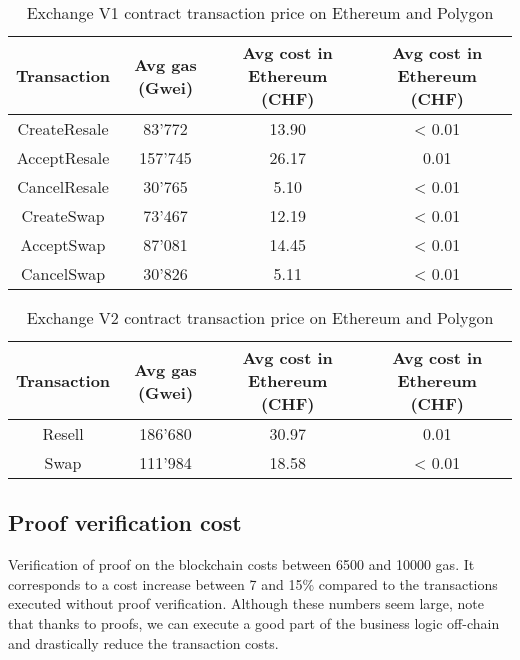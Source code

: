 \documentclass[a4paper,11pt,oneside]{report}
\begin{document}
\begin{table}[h!]
\begin{center}
\begin{NiceTabular}{ |c||c|c|c| }
 \hline
 Transaction & Avg gas (Gwei) & Avg cost in Ethereum (CHF) & Avg cost in Ethereum (CHF) \\
 \hline \hline
 CreateResale & 83'772 & 13.90 & < 0.01 \\
 AcceptResale & 157'745 & 26.17 & 0.01 \\
 CancelResale & 30'765 & 5.10 & < 0.01 \\
 CreateSwap & 73'467 & 12.19 & < 0.01 \\
 AcceptSwap & 87'081 & 14.45 & < 0.01 \\
 CancelSwap & 30'826 & 5.11 & < 0.01 \\
 \hline
\end{NiceTabular}
\caption{Exchange V1 contract transaction price on Ethereum and Polygon}
\label{table:exchangeV1_contract_transaction_cost}
\end{center}
\end{table}

\begin{table}[h!]
\begin{center}
\begin{NiceTabular}{ |c||c|c|c| }
 \hline
 Transaction & Avg gas (Gwei) & Avg cost in Ethereum (CHF) & Avg cost in Ethereum (CHF) \\
 \hline \hline
 Resell & 186'680 & 30.97 & 0.01 \\
 Swap & 111'984 & 18.58 & < 0.01 \\
 \hline
\end{NiceTabular}
\caption{Exchange V2 contract transaction price on Ethereum and Polygon}
\label{table:exchangeV2_contract_transaction_cost}
\end{center}
\end{table}

\subsection{Proof verification cost}
Verification of proof on the blockchain costs between 6500 and 10000 gas. It corresponds to a cost increase between 7 and 15\% compared to the transactions executed without proof verification. Although these numbers seem large, note that thanks to proofs, we can execute a good part of the business logic off-chain and drastically reduce the transaction costs.

\end{document}
